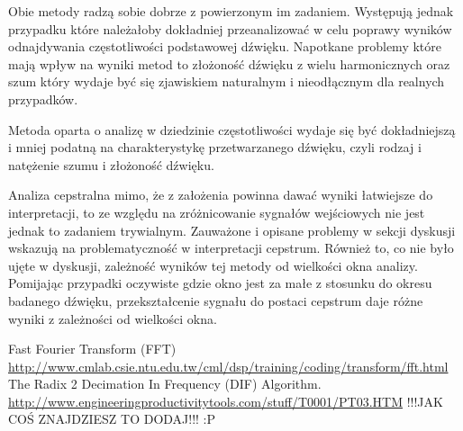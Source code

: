 \documentclass{classrep}
\begin{document}
Obie metody radzą sobie dobrze z powierzonym im zadaniem. Występują jednak przypadku które należałoby dokładniej przeanalizować w celu poprawy wyników odnajdywania częstotliwości podstawowej dźwięku. Napotkane problemy które mają wpływ na wyniki metod to złożoność dźwięku z wielu harmonicznych oraz szum który wydaje być się zjawiskiem naturalnym i nieodłącznym dla realnych przypadków.

Metoda oparta o analizę w dziedzinie częstotliwości wydaje się być dokładniejszą i mniej podatną na charakterystykę przetwarzanego dźwięku, czyli rodzaj i natężenie szumu i złożoność dźwięku.

Analiza cepstralna mimo, że z założenia powinna dawać wyniki łatwiejsze do interpretacji, to ze względu na zróżnicowanie sygnałów wejściowych nie jest jednak to zadaniem trywialnym. Zauważone i opisane problemy w sekcji dyskusji wskazują na problematyczność w interpretacji cepstrum. Również to, co nie było ujęte w dyskusji, zależność wyników tej metody od wielkości okna analizy. Pomijając przypadki oczywiste gdzie okno jest za małe z stosunku do okresu badanego dźwięku, przekształcenie sygnału do postaci cepstrum daje różne wyniki z zależności od wielkości okna.


\begin{thebibliography}{8}

 Fast Fourier Transform (FFT) \url{http://www.cmlab.csie.ntu.edu.tw/cml/dsp/training/coding/transform/fft.html}
 The Radix 2 Decimation In Frequency (DIF) Algorithm.  \url{http://www.engineeringproductivitytools.com/stuff/T0001/PT03.HTM}
 !!!JAK COŚ ZNAJDZIESZ TO DODAJ!!! :P


\end{thebibliography}
\end{document}
